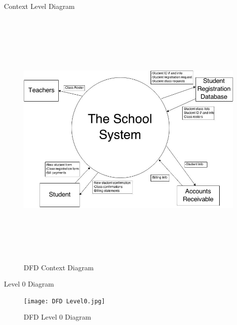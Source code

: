 \documentclass{article}
\begin{document}
\newpage
\iffalse
\begin{section}{Context Level Diagram}
    \begin{figure}[h!]
        \begin{center}
           \centerline{ \includegraphics[height=13cm]{DF.jpg}}
            \caption{DFD Context Diagram}
        \end{center}
    \end{figure}
\end{section}
\newpage
\begin{section}{Level 0 Diagram}
    \begin{figure}[h!]
        \begin{center}
            \centerline{\texttt{[image: DFD Level0.jpg]}}
            \caption{DFD Level 0 Diagram}
        \end{center}
    \end{figure}
\end{section}
\newpage
\end{document}
